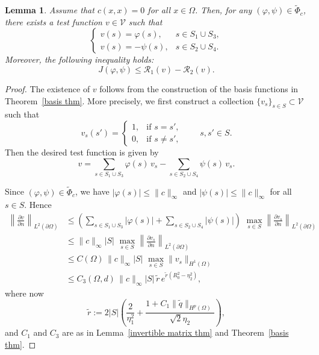 \documentclass[12pt]{amsart}
\newtheorem{lem}[thm]{Lemma}
\begin{document}
\begin{lem}\label{combine test functino lem}
    Assume that \( c(x,x) = 0 \) for all \( x \in \Omega \). 
    Then, for any \( (\varphi, \psi) \in \widetilde\Phi_c \), there exists a test function \( v \in \mathcal{V} \) such that
\[
\begin{cases}
v(s) = \varphi(s), & s \in S_1 \cup S_3, \\[0.2em]
v(s) = -\psi(s),   & s \in S_2 \cup S_4.
\end{cases}
\]
Moreover, the following inequality holds:
\begin{equation} \label{J and v}
    J(\varphi, \psi) \leq \mathcal{R}_1(v) - \mathcal{R}_2(v).
\end{equation}
\end{lem}
\begin{proof}

    The existence of \( v \) follows from the construction of the basis functions in Theorem~\ref{basis thm}. 
   More precisely, we first construct a collection \( \{v_s\}_{s \in S} \subset \mathcal{V} \) such that
    \[
    v_s(s') = 
    \begin{cases}
    1, & \text{if } s = s', \\[0.2em]
    0, & \text{if } s \neq s',
    \end{cases}
    \qquad s,s'\in S.
    \]
    Then the desired test function is given by
    \[
    v = \sum_{s \in S_1 \cup S_3} \varphi(s)\, v_s
        - \sum_{s \in S_2 \cup S_4} \psi(s)\, v_s.
    \]

    Since \( (\varphi, \psi) \in \widetilde\Phi_c \), we have 
    \(|\varphi(s)| \le \|c\|_\infty\) and \(|\psi(s)| \le \|c\|_\infty\) for all \(s\in S\). Hence
    \begin{equation}\label{estimate of v on boundary}
    \begin{aligned}
    \left\| \frac{\partial v}{\partial n} \right\|_{L^2(\partial \Omega)} 
    &\leq \left( \sum_{s \in S_1 \cup S_3} |\varphi(s)| 
            + \sum_{s \in S_2 \cup S_4} |\psi(s)| \right) \,\,
        \max_{s \in S} \left\| \frac{\partial v_s}{\partial n} \right\|_{L^2(\partial \Omega)} \\
    &\leq \|c\|_\infty |S| \,\, \max_{s \in S} \left\| \frac{\partial v_s}{\partial n} \right\|_{L^2(\partial \Omega)} \\
    &\leq C(\Omega)\,\|c\|_\infty |S| \,\, \max_{s \in S} \|v_s\|_{H^1(\Omega)} \\
    &\leq C_3(\Omega,d)\,\|c\|_\infty |S|\, \tilde{r}\, e^{\tilde{r}(R_0^2 - \eta_2^2)},
    \end{aligned}
    \end{equation}
    where now
    \[
    \tilde{r} := 2|S| \left( \frac{2}{\eta_1^2} 
        + \frac{1 + C_1 \|\tilde{q}\|_{H^p(\Omega)}}{\sqrt{2} \eta_2} \right),
    \]
    and \(C_1\) and \(C_3\) are as in Lemma~\ref{invertible matrix thm} and Theorem~\ref{basis thm}.


\end{proof}
\end{document}
